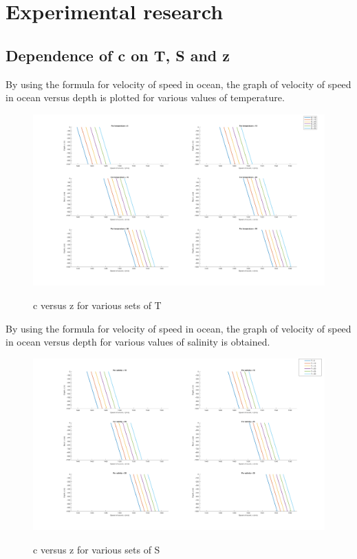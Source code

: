 \chapter{Experimental research} \label{Experimental research}

\section{Dependence of c on T, S and z } \label{Dependence of c on T, S and z}
\noindent By using the formula for velocity of speed in ocean, the graph of velocity of speed in ocean versus depth is plotted for various values of temperature. 

\begin{figure}[H]
\centering
{\includegraphics[scale=0.18]{ucp1.png}}
\caption{c versus z for various sets of T}
\end{figure}

\noindent By using the formula for velocity of speed in ocean, the graph of velocity of speed in ocean versus depth for various values of salinity is obtained. 

\begin{figure}[H]
\centering
{\includegraphics[scale=0.18]{ucp2.png}}
\caption{c versus z for various sets of S}
\end{figure}

\noindent 
